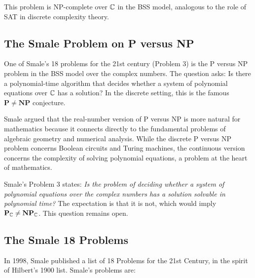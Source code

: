 This problem is NP-complete over \(\mathbb{C}\) in the BSS model, analogous to the role of SAT in discrete complexity theory.

\subsection{The Smale Problem on P versus NP}

One of Smale's 18 problems for the 21st century (Problem 3) is the P versus NP problem in the BSS model over the complex numbers. The question asks: Is there a polynomial-time algorithm that decides whether a system of polynomial equations over \(\mathbb{C}\) has a solution? In the discrete setting, this is the famous \(\mathbf{P} \neq \mathbf{NP}\) conjecture.

Smale argued that the real-number version of P versus NP is more natural for mathematics because it connects directly to the fundamental problems of algebraic geometry and numerical analysis. While the discrete P versus NP problem concerns Boolean circuits and Turing machines, the continuous version concerns the complexity of solving polynomial equations, a problem at the heart of mathematics.

Smale's Problem 3 states: \textit{Is the problem of deciding whether a system of polynomial equations over the complex numbers has a solution solvable in polynomial time?} The expectation is that it is not, which would imply \(\mathbf{P}_{\mathbb{C}} \neq \mathbf{NP}_{\mathbb{C}}\). This question remains open.

\subsection{The Smale 18 Problems}

In 1998, Smale published a list of 18 Problems for the 21st Century, in the spirit of Hilbert's 1900 list. Smale's problems are:

